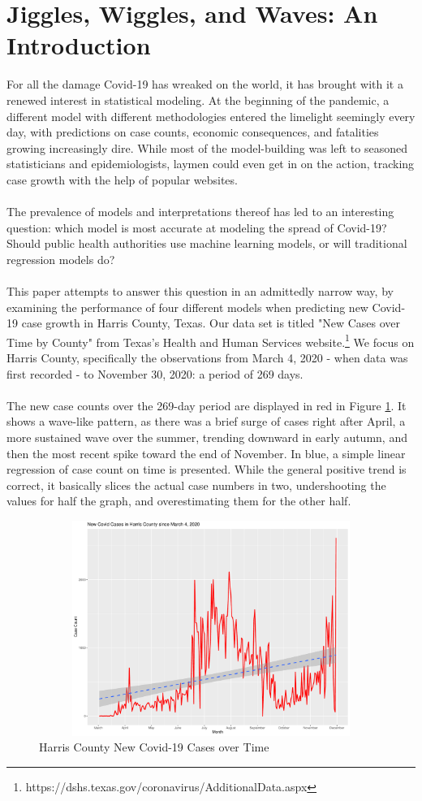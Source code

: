 \documentclass{article}
\begin{document}
\section{Jiggles, Wiggles, and Waves: An Introduction}
For all the damage Covid-19 has wreaked on the world, it has brought with it a renewed interest in statistical modeling. At the beginning of the pandemic, a different model with different methodologies entered the limelight seemingly every day, with predictions on case counts, economic consequences, and fatalities growing increasingly dire. While most of the model-building was left to seasoned statisticians and epidemiologists, laymen could even get in on the action, tracking case growth with the help of popular websites.\\\\
The prevalence of models and interpretations thereof has led to an interesting question: which model is most accurate at modeling the spread of Covid-19? Should public health authorities use machine learning models, or will traditional regression models do?\\\\
This paper attempts to answer this question in an admittedly narrow way, by examining the performance of four different models when predicting new Covid-19 case growth in Harris County, Texas. Our data set is titled "New Cases over Time by County" from Texas's Health and Human Services website.\footnote{https://dshs.texas.gov/coronavirus/AdditionalData.aspx} We focus on Harris County, specifically the observations from March 4, 2020 - when data was first recorded - to November 30, 2020: a period of 269 days.\\\\
The new case counts over the 269-day period are displayed in red in Figure \ref{new_cases}. It shows a wave-like pattern, as there was a brief surge of cases right after April, a more sustained wave over the summer, trending downward in early autumn, and then the most recent spike toward the end of November. In blue, a simple linear regression of case count on time is presented. While the general positive trend is correct, it basically slices the actual case numbers in two, undershooting the values for half the graph, and overestimating them for the other half.
\begin{figure}[H]
    \centering
    \includegraphics[width=12cm,height=7cm]{graphs/new_cases.pdf}
    \caption{Harris County New Covid-19 Cases over Time}
    \label{new_cases}
\end{figure}
\end{document}
